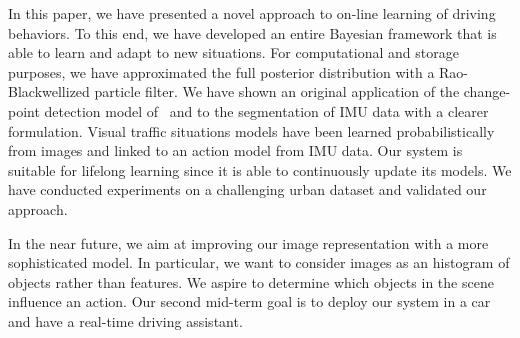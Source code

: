 In this paper, we have presented a novel approach to on-line learning of driving
behaviors. To this end, we have developed an entire Bayesian framework that is
able to learn and adapt to new situations. For computational and storage
purposes, we have approximated the full posterior distribution with a
Rao-Blackwellized particle filter. We have shown an original application of the
change-point detection model of~\cite{adams07bayesian} and
\cite{fearnhead07online} to the segmentation of IMU data with a clearer
formulation. Visual traffic situations models have been learned
probabilistically from images and linked to an action model from IMU data. Our
system is suitable for lifelong learning since it is able to continuously update
its models. We have conducted experiments on a challenging urban dataset and
validated our approach.

In the near future, we aim at improving our image representation with a more
sophisticated model. In particular, we want to consider images as an histogram
of objects rather than features. We aspire to determine which objects in the
scene influence an action. Our second mid-term goal is to deploy our system in
a car and have a real-time driving assistant.
